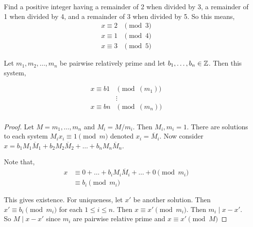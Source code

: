 \begin{eg}
	Find a positive integer having a remainder of 2 when divided by 3, a remainder of 1 when divided by 4, and a remainder of 3 when divided by 5. So this means,
	\begin{align*}
		x \equiv 2 &\pmod 3\\
		x \equiv 1 &\pmod 4\\
		x \equiv 3 &\pmod 5
	\end{align*}
\end{eg}
\begin{theorem}
	Let \( m_1, m_2, \dots, m_n \) be pairwise relatively prime and let \( b_1, \dots, b_n \in \mathbb{Z} \).  Then this system,

	\begin{align*}
		x \equiv b1 &\pmod (m_1)\\
			    &\vdots\\
		x \equiv bn &\pmod (m_n)\\
	\end{align*}
\end{theorem}
\begin{proof}
	Let \( M = m_1, \dots, m_n \) and \( M_i = M/m_i\). Then \( M_i, m_i = 1 \). There are solutions to each system \( M_ix_i \equiv 1 \pmod m \) denoted \( x_i = \overline M_i \). Now consider \( x = b_1M_1\overline M_1 +  b_2M_2\overline M_2 + \dots +  b_nM_n\overline M_n \).

	\vspace{1em}

	Note that,
	\begin{align*}
		x &\equiv 0 + \dots + b_iM_i\overline M_i + \dots + 0 \pmod m_i \\
		  & \equiv b_i \pmod m_i
	\end{align*}

	This gives existence. For uniqueness, let \( x' \) be another solution. Then \( x' \equiv b_i \pmod m_i \) for each \( 1 \le i \le n \). Then \( x \equiv x' \pmod m_i \). Then \( m_i \mid x - x' \). So \( M \mid x - x' \) since \( m_i \) are pairwise relative prime and \( x \equiv x' \pmod M \)
\end{proof}



